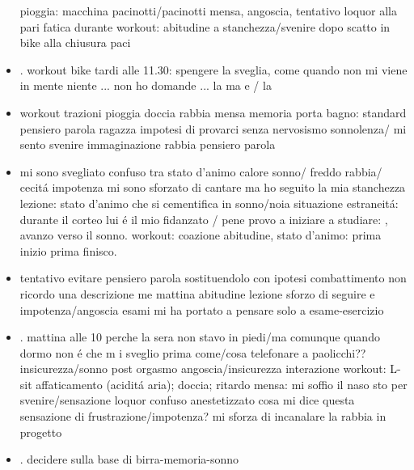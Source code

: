 \begin{itemize}
pioggia: macchina pacinotti/pacinotti mensa, angoscia, 
tentativo loquor alla pari
fatica durante workout: abitudine a 
stanchezza/svenire dopo scatto in bike alla chiusura paci
\item {}.
workout bike tardi alle 11.30: spengere la sveglia, come quando non mi viene in mente niente ... non ho domande ... la  ma e / la 
\item {}
workout trazioni pioggia doccia
rabbia mensa memoria porta bagno: standard pensiero parola
ragazza impotesi di provarci senza nervosismo
sonnolenza/ mi sento svenire immaginazione rabbia pensiero parola
\item {}
mi sono svegliato confuso tra stato d'animo calore sonno/ freddo rabbia/ cecit\'a impotenza
mi sono sforzato di cantare ma ho seguito la mia stanchezza
lezione: stato d'animo che si cementifica in sonno/noia
situazione estraneit\'a: durante il corteo lui \'e il mio fidanzato / pene 
provo a iniziare a studiare: , avanzo verso il sonno.
workout: coazione abitudine, stato d'animo: prima inizio prima finisco.
\item {}
tentativo evitare pensiero parola sostituendolo con ipotesi combattimento
non ricordo una descrizione me mattina abitudine lezione
sforzo di seguire e impotenza/angoscia esami mi ha portato a pensare solo a esame-esercizio
\item {}.
mattina alle 10 perche la sera non stavo in piedi/ma comunque quando dormo non \'e che m i sveglio prima
come/cosa telefonare a paolicchi??
insicurezza/sonno post orgasmo
angoscia/insicurezza interazione
workout: L-sit affaticamento (acidit\'a aria); doccia; ritardo mensa: mi soffio il naso sto per svenire/sensazione loquor confuso anestetizzato
cosa mi dice questa sensazione di frustrazione/impotenza? mi sforza di incanalare la rabbia in progetto
\item {}.
decidere sulla base di 
birra-memoria-sonno

\end{itemize}
